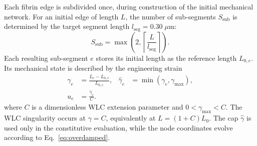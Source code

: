\documentclass[twocolumn, 10pt]{article}
\begin{document}
Each fibrin edge is subdivided once, during construction of the initial mechanical network. For an initial edge of length $L$, the number of sub-segments $S_{\mathrm{sub}}$ is determined by the target segment length $l_{\mathrm{seg}}=0.30\;\mu\mathrm{m}$:
\begin{equation}
S_{\mathrm{sub}}=\max\!\left(2,
\left\lceil\frac{L}{l_{\mathrm{seg}}}\right\rceil\right).
\label{eq:initial-discretization}
\end{equation}
Each resulting sub-segment $e$ stores its initial length as the reference length $L_{0,e}$. Its mechanical state is described by the engineering strain
\begin{equation}
\begin{aligned}
    \gamma_e &= \frac{L_e-L_{0,e}}{L_{0,e}},
    &\widehat{\gamma}_e &= \min(\gamma_e,\gamma_{\max}),\\
    u_e &= \frac{\widehat{\gamma}_e}{C}.
\end{aligned}
    \label{eq:wlcstrain}
\end{equation}
where $C$ is a dimensionless WLC extension parameter and $0<\gamma_{\max}<C$. The WLC singularity occurs at $\gamma=C$, equivalently at $L=(1+C)L_0$. The cap $\widehat\gamma$ is used only in the constitutive evaluation, while the node coordinates evolve according to Eq.~\eqref{eq:overdamped}.
\end{document}
